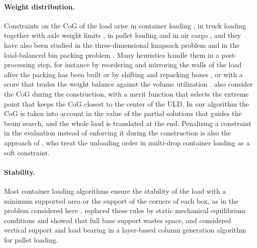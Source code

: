 \paragraph{Weight distribution.}
Constraints on the CoG of the load arise in container loading \citep{Davies1999}, in truck
loading together with axle weight limits \citep{Lim2013,Alonso2017}, in pallet
loading and in air cargo \citep{Chan2006,Paquay2016}, and they have also been studied in the
three-dimensional knapsack problem \citep{Baldi2012} and in the load-balanced bin packing
problem \citep{Trivella2016}. Many heuristics handle them in a post-processing step, for
instance by reordering and mirroring the walls of the load after the packing has been built
\citep{Davies1999} or by shifting and repacking boxes \citep{Paquay2018b}, or with a score that trades the weight balance against the volume
utilization \citep{Hessler2025}. \citet{Paquay2018b} also consider the CoG during the
construction, with a merit function that selects the extreme point that keeps the CoG closest to
the center of the ULD. In our algorithm the CoG is taken into account in the value of the partial
solutions that guides the beam search, and the whole load is translated at the end. Penalizing
a constraint in the evaluation instead of enforcing it during the construction is also the
approach of \citet{BonetFilella2023}, who treat the unloading order in multi-drop container
loading as a soft constraint.

\paragraph{Stability.}
Most container loading algorithms ensure the stability of the load with a minimum supported
area or the support of the corners of each box, as in the problem considered here
\citep{Paquay2016,Bortfeldt2013}. \citet{Ramos2016} replaced these rules by static mechanical
equilibrium conditions and showed that full base support wastes space, and \citet{Gzara2020}
considered vertical support and load bearing in a layer-based column generation algorithm for
pallet loading.

